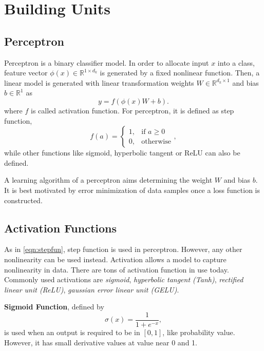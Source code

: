 \section{Building Units}
\label{sec:building_units}

\subsection{Perceptron}

Perceptron is a binary classifier model. 
In order to allocate input $x$ into a class, feature vector $\phi(x) \in \mathbb{R}^{1 \times d_k}$ is generated by a fixed nonlinear function. 
Then, a linear model is generated with linear transformation weights $W \in \mathbb{R}^{d_k \times 1}$ and bias $b \in \mathbb{R}^{1}$ as 
\begin{equation}
\label{eqn:perceptron1}
y = f(\phi(x) W + b).
\end{equation}
where $f$ is called activation function. 
For perceptron, it is defined as step function, 
\begin{equation}
\label{eqn:stepfun}
f(a) = 
\begin{cases}
1,   & \text{if } a\geq 0\\
0,   & \text{otherwise}
\end{cases},
\end{equation}
while other functions like sigmoid, hyperbolic tangent or ReLU can also be defined. 

A learning algorithm of a perceptron aims determining the weight $W$ and bias $b$. 
It is best motivated by error minimization of data samples once a loss function is constructed. 

\subsection{Activation Functions}

As in \eqref{eqn:stepfun}, step function is used in perceptron. 
However, any other nonlinearity can be used instead. 
Activation allows a model to capture nonlinearity in data. 
There are tons of activation function in use today. 
Commonly used activations are \textit{sigmoid}, \textit{hyperbolic tangent (Tanh)}, \textit{rectified linear unit (ReLU)}, \textit{gaussian error linear unit (GELU)}. 

\textbf{Sigmoid Function}, defined by 
\begin{equation}
\label{eqn:sigmoid_fcn}
\sigma(x) = \frac{1}{1+e^{-x}},
\end{equation}
is used when an output is required to be in $[0,1]$, like probability value. However, it has small derivative values at value near 0 and 1. 

